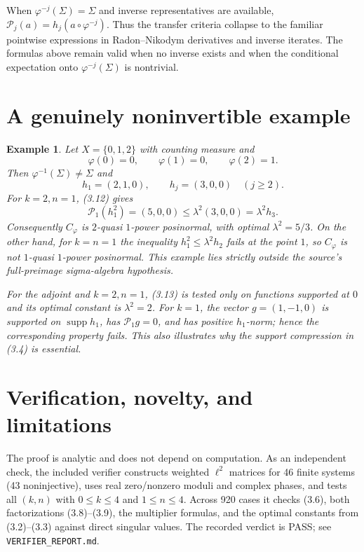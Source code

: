 \documentclass[11pt]{article}
\newtheorem{example}[theorem]{Example}
\newcommand{\Perr}{\mathcal P}
\newcommand{\1}{\mathbf 1}
\newcommand{\supp}{\operatorname{supp}}
\begin{document}
When $\varphi^{-j}(\Sigma)=\Sigma$ and inverse representatives are available,
$\Perr_j(a)=h_j(a\circ\varphi^{-j})$.  Thus the transfer criteria collapse to
the familiar pointwise expressions in Radon--Nikodym derivatives and inverse
iterates.  The formulas above remain valid when no inverse exists and when the
conditional expectation onto $\varphi^{-j}(\Sigma)$ is nontrivial.

\section{A genuinely noninvertible example}

\begin{example}
Let $X=\{0,1,2\}$ with counting measure and
\[
 \varphi(0)=0,\qquad \varphi(1)=0,\qquad \varphi(2)=1.
\]
Then $\varphi^{-1}(\Sigma)\ne\Sigma$ and
\[
 h_1=(2,1,0),\qquad h_j=(3,0,0)\quad(j\ge2).
\]
For $k=2,n=1$, (3.12) gives
\[
 \Perr_1(h_1^2)=(5,0,0)
 \le\lambda^2(3,0,0)=\lambda^2h_3.
\]
Consequently $C_\varphi$ is $2$-quasi $1$-power posinormal, with optimal
$\lambda^2=5/3$.  On the other hand, for $k=n=1$ the inequality
$h_1^2\le\lambda^2h_2$ fails at the point $1$, so $C_\varphi$ is not
$1$-quasi $1$-power posinormal.  This example lies strictly outside the
source's full-preimage sigma-algebra hypothesis.

For the adjoint and $k=2,n=1$, (3.13) is tested only on functions supported at
$0$ and its optimal constant is $\lambda^2=2$.  For $k=1$, the vector
$g=(1,-1,0)$ is supported on $\supp h_1$, has $\Perr_1g=0$, and has positive
$h_1$-norm; hence the corresponding property fails.  This also illustrates
why the support compression in (3.4) is essential.
\end{example}

\section{Verification, novelty, and limitations}

The proof is analytic and does not depend on computation.  As an independent
check, the included verifier constructs weighted $\ell^2$ matrices for 46
finite systems (43 noninjective), uses real zero/nonzero moduli and complex
phases, and tests all $(k,n)$ with $0\le k\le4$ and $1\le n\le4$.  Across 920
cases it checks (3.6), both factorizations (3.8)--(3.9), the multiplier
formulas, and the optimal constants from (3.2)--(3.3) against direct singular
values.  The recorded verdict is PASS; see
\texttt{VERIFIER\_REPORT.md}.
\end{document}

